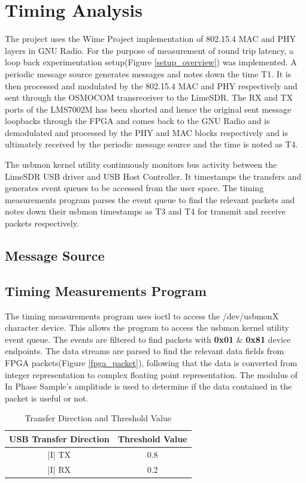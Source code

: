 \section{Timing Analysis}

The project uses the Wime Project implementation of 802.15.4 MAC and PHY layers in GNU Radio. For the purpose of measurement of round trip latency, a loop back experimentation setup(Figure \ref{setup_overview}) was implemented. A periodic message source generates messages and notes down the time T1. It is then processed and modulated by the 802.15.4 MAC and PHY respectively and sent through the OSMOCOM transreceiver to the LimeSDR. The RX and TX ports of the LMS7002M has been shorted and hence the original sent message loopbacks through the FPGA and comes back to the GNU Radio and is demodulated and processed by the PHY and MAC blocks respectively and is ultimately received by the periodic message source and the time is noted as T4.

The usbmon kernel utility continuously monitors bus activity between the LimeSDR USB driver and USB Host Controller. It timestamps the transfers and generates event queues to be accessed from the user space. The timing measurements program parses the event queue to find the relevant packets and notes down their usbmon timestamps as T3 and T4 for transmit and receive packets respectively.  
\subsection{Message Source}

\subsection{Timing Measurements Program}
The timing measurements program uses ioctl to access the /dev/usbmonX character device. This allows the program to access the usbmon kernel utility event queue. The events are filtered to find packets with \textbf{0x01} \& \textbf{0x81} device endpoints. The data streams are parsed to find the relevant data fields from FPGA packets(Figure \ref{fpga_packet}), following that the data is converted from integer representation to complex floating point representation. The modulus of In Phase Sample's amplitude is used to determine if the data contained in the packet is useful or not. 

\begin{table}
\centering
\begin{tabular}{|c|c|}
\hline
USB Transfer Direction & Threshold Value  \\
\hline
|I| TX & 0.8\\
|I| RX & 0.2\\
\hline
\end{tabular}
\caption{Transfer Direction and Threshold Value}
\label{thres_table}
\end{table}


